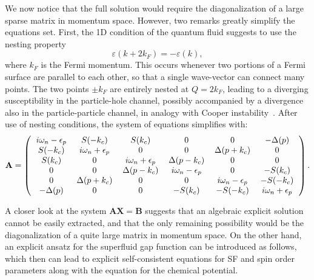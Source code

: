 \documentclass[pra,aps,superscriptaddress,twocolumn]{revtex4}
\begin{document}
\begin{widetext}
We now notice that the full solution would require the diagonalization of a large sparse matrix in momentum space.
However, two remarks greatly simplify the equations set. First, the 1D condition of the quantum fluid suggests
to use the nesting property
\begin{equation}
  \varepsilon(k+2k_F)=-\varepsilon(k),
  \label{eq:appnesting}
\end{equation}
where $k_F$ is the Fermi momentum.
This occurs whenever two portions of a Fermi surface are parallel to each other, so that a single wave-vector can connect many points.
The two points $\pm k_F$ are entirely nested at $Q=2k_F$, leading to a diverging
susceptibility in the particle-hole channel, possibly accompanied by a divergence also in the particle-particle
channel, in analogy with Cooper instability~\cite{Giamarchi}. After use of nesting conditions, the system of equations simplifies with:
\begin{equation}
  \mathbf{A}=
  \begin{pmatrix}
    \begin{tabular}{  c c c c c c }
      $i\omega_n-\epsilon_{p}$ & $S(-k_c)$ & $S(\small{k_c})$ & 0 & 0 & $-\Delta(p) $ \\
      $S(-k_c)$ & $i\omega_n+\epsilon_p$ & 0 & 0 & $\Delta(p+k_c)$ & 0 \\
      $S(k_c)$ & 0 & $i\omega_n+\epsilon_p$ & $\Delta(p-k_c)$ & 0 & 0 \\
      0 & 0 & $\Delta(p-k_c)$ & $i\omega_n-\epsilon_p$ & 0 & $-S(k_c)$ \\
      0 & $\Delta(p+k_c)$ & 0 & 0 & $i\omega_n-\epsilon_p$ & $-S(-k_c)$ \\
      $-\Delta(p)$ & 0 & 0 & $-S(k_c)$&$-S(-k_c)$ & $i\omega_n+\epsilon_p$
    \end{tabular}
  \end{pmatrix}.
  \label{eq:AmatrixNest}
\end{equation}
\end{widetext}
%
A closer look at the system $\mathbf{AX}=\mathbf{B}$ suggests that an algebraic explicit solution cannot be easily extracted,
and that the only remaining possibility would be the diagonalization of a quite large matrix in momentum space.
On the other hand, an explicit ansatz for the superfluid gap function can be introduced as follows,
which then can lead to explicit self-consistent equations for SF and spin order parameters
along with the equation for the chemical potential.
\end{document}
